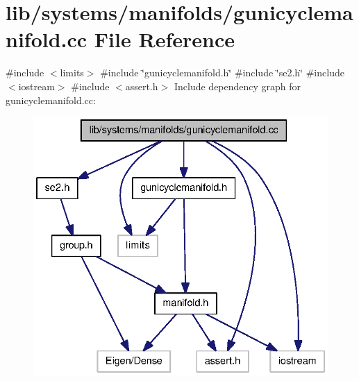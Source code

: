 \section{lib/systems/manifolds/gunicyclemanifold.cc \-File \-Reference}
\label{gunicyclemanifold_8cc}
{\ttfamily \#include $<$limits$>$}\*
{\ttfamily \#include \char`\"{}gunicyclemanifold.\-h\char`\"{}}\*
{\ttfamily \#include \char`\"{}se2.\-h\char`\"{}}\*
{\ttfamily \#include $<$iostream$>$}\*
{\ttfamily \#include $<$assert.\-h$>$}\*
\-Include dependency graph for gunicyclemanifold.\-cc\-:\nopagebreak
\begin{figure}[H]
\begin{center}
\leavevmode
\includegraphics[width=332pt]{gunicyclemanifold_8cc__incl}
\end{center}
\end{figure}
